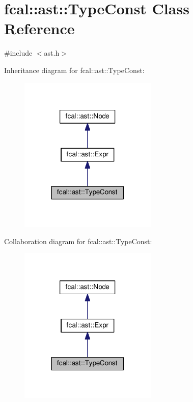 \hypertarget{classfcal_1_1ast_1_1TypeConst}{}\section{fcal\+:\+:ast\+:\+:Type\+Const Class Reference}
\label{classfcal_1_1ast_1_1TypeConst}


{\ttfamily \#include $<$ast.\+h$>$}



Inheritance diagram for fcal\+:\+:ast\+:\+:Type\+Const\+:
\nopagebreak
\begin{figure}[H]
\begin{center}
\leavevmode
\includegraphics[width=186pt]{classfcal_1_1ast_1_1TypeConst__inherit__graph}
\end{center}
\end{figure}


Collaboration diagram for fcal\+:\+:ast\+:\+:Type\+Const\+:
\nopagebreak
\begin{figure}[H]
\begin{center}
\leavevmode
\includegraphics[width=186pt]{classfcal_1_1ast_1_1TypeConst__coll__graph}
\end{center}
\end{figure}
